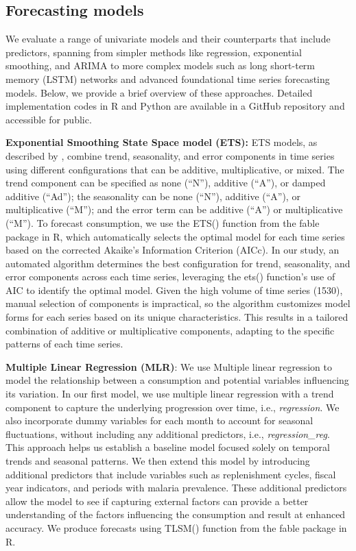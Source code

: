 \documentclass[
  authoryear,
  preprint,
  3p]{elsarticle}
\begin{document}
\subsection{Forecasting models}\label{forecasting-models}

We evaluate a range of univariate models and their counterparts that
include predictors, spanning from simpler methods like regression,
exponential smoothing, and ARIMA to more complex models such as long
short-term memory (LSTM) networks and advanced foundational time series
forecasting models. Below, we provide a brief overview of these
approaches. Detailed implementation codes in R and Python are available
in a GitHub repository and accessible for public.

\textbf{Exponential Smoothing State Space model (ETS):} ETS models, as
described by \citet{hyndman2021forecasting}, combine trend, seasonality,
and error components in time series using different configurations that
can be additive, multiplicative, or mixed. The trend component can be
specified as none (``N''), additive (``A''), or damped additive
(``Ad''); the seasonality can be none (``N''), additive (``A''), or
multiplicative (``M''); and the error term can be additive (``A'') or
multiplicative (``M''). To forecast consumption, we use the ETS()
function from the fable package in R, which automatically selects the
optimal model for each time series based on the corrected Akaike's
Information Criterion (AICc). In our study, an automated algorithm
determines the best configuration for trend, seasonality, and error
components across each time series, leveraging the ets() function's use
of AIC to identify the optimal model. Given the high volume of time
series (1530), manual selection of components is impractical, so the
algorithm customizes model forms for each series based on its unique
characteristics. This results in a tailored combination of additive or
multiplicative components, adapting to the specific patterns of each
time series.

\textbf{Multiple Linear Regression (MLR)}: We use Multiple linear
regression to model the relationship between a consumption and potential
variables influencing its variation. In our first model, we use multiple
linear regression with a trend component to capture the underlying
progression over time, i.e., \emph{regression}. We also incorporate
dummy variables for each month to account for seasonal fluctuations,
without including any additional predictors, i.e.,
\emph{regression\_reg}. This approach helps us establish a baseline
model focused solely on temporal trends and seasonal patterns. We then
extend this model by introducing additional predictors that include
variables such as replenishment cycles, fiscal year indicators, and
periods with malaria prevalence. These additional predictors allow the
model to see if capturing external factors can provide a better
understanding of the factors influencing the consumption and result at
enhanced accuracy. We produce forecasts using TLSM() function from the
fable package in R.
\end{document}
